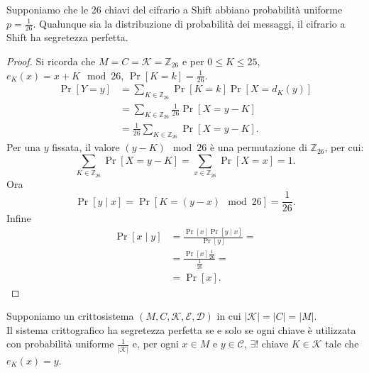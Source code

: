 





\begin{theorem} Supponiamo che le 26 chiavi del cifrario a Shift abbiano probabilità uniforme $p = \frac{1}{26}$. Qualunque sia la distribuzione di probabilità dei messaggi, il cifrario a Shift ha segretezza perfetta.
\end{theorem}
\begin{proof}
    Si ricorda che $M = C = \mathcal{K} = \mathbb{Z}_{26}$ e per $0 \leq K \leq 25$, $e_K(x) = x + K \mod 26 $, $\Pr[K = k] = \frac{1}{26}$.
    \begin{align*}
        \Pr[Y = y] &= \sum_{K \in \mathbb{Z}_{26}} \Pr[K = k]\Pr[X = d_K(y)]\\
        & = \sum_{K \in \mathbb{Z}_{26}} \frac{1}{26} \Pr[X = y - K]\\
        & = \frac{1}{26} \sum_{K \in \mathbb{Z}_{26}}\Pr[X = y - K].
    \end{align*}
    Per una $y$ fissata, il valore $(y-K) \mod 26$ è una permutazione di $\mathbb{Z}_{26}$, per cui:
    \[
        \sum_{K \in \mathbb{Z}_{26}}\Pr[X = y - K] = \sum_{x \in \mathbb{Z}_{26}}\Pr[X = x] = 1.
    \]
    Ora
    \[
        \Pr[y \mid x] = \Pr[K = (y-x) \mod 26] = \frac{1}{26}.
    \]
    Infine 
    \begin{align*}        
        \Pr[x \mid y] &= \frac{\Pr[x]\Pr[y \mid x]}{\Pr[y]} =\\
        &= \frac{\Pr[x]\frac{1}{26}}{\frac{1}{26}} =\\
        & = \Pr[x].
    \end{align*}
\end{proof}

\begin{theorem} 
    Supponiamo un crittosistema $(M,C,\mathcal{K},\mathcal{E},\mathcal{D})$ in cui $|\mathcal{K}| = |C| = |M|$. \\
    Il sistema crittografico ha segretezza perfetta se e solo se ogni chiave è utilizzata con probabilità uniforme $\frac{1}{|\mathcal{K}|}$ e, per ogni $ x \in M$ e $y \in \mathcal{C}$, $\exists ! $ chiave $K \in \mathcal{K}$ tale che $e_{K}(x) = y$.
\end{theorem}


